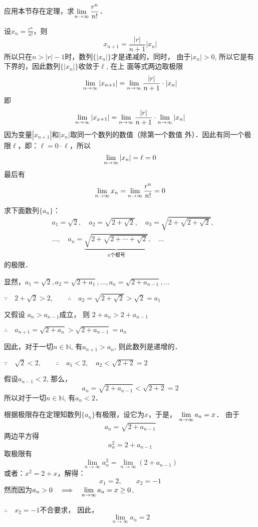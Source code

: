 \begin{example}
    应用本节存在定理，求$\displaystyle\lim_{n\to\infty}\dfrac{r^n}{n!}$．
\end{example}

\begin{solution}
    设$x_n=\frac{r^n}{n!}$，则
\[x_{n+1}=\frac{|r|}{n+1}|x_n|\]
所以只在$n>|r|-1$时，数列$\{|x_n|\}$才是递减的，同时，
由于$|x_n|>0$, 所以它是有下界的，因此数列$\{|x_n|\}$收敛于$\ell$, 在上
面等式两边取极限
\[\displaystyle\lim_{n\to\infty}|x_{n+1}|=\displaystyle\lim_{n\to\infty}\dfrac{|r|}{n+1}\cdot |x_n|\]
即
\[\displaystyle\lim_{n\to\infty}|x_{x+1}|=\displaystyle\lim_{n\to\infty}\dfrac{|r|}{n+1}\cdot \displaystyle\lim_{n\to\infty}|x_n|\]
因为变量$|x_{n+1}|$和$|x_n|$取同一个数列的数值（除第一个数值
外）．因此有同一个极限$\ell$，即：$\ell=0\cdot \ell$，所以
\[\displaystyle\lim_{n\to\infty}|x_n|=\ell=0\]
最后有
\[\displaystyle\lim_{n\to\infty} x_n=\displaystyle\lim_{n\to\infty} \dfrac{r^n}{n!} =0\]
\end{solution}

\begin{example}
    求下面数列$\{a_n\}$：
\[\begin{split}
   &  a_1=\sqrt{2},\quad a_2=\sqrt{2+\sqrt{2}},\quad a_3=\sqrt{2+\sqrt{2+\sqrt{2}}},\\
    & \ldots,\quad a_n=\underbrace{\sqrt{2+\sqrt{2+\cdots+\sqrt{2}}}}_{\text{$n$个根号}},\quad\ldots
\end{split} \]
的极限．
\end{example}
   
\begin{solution}
显然，$a_1=\sqrt{2}, a_2=\sqrt{2+a_1},\ldots,
a_n=\sqrt{2+a_{n-1}},\ldots$

$\because\quad 2+\sqrt{2}>2,\qquad \therefore\quad a_2=\sqrt{2+\sqrt{2}}>\sqrt{2}=a_1$

又假设
$a_n>a_{n-1}$成立，
则
$2+a_n>2+a_{n-1}$

$\therefore\quad a_{n+1}=\sqrt{2+a_n}>\sqrt{2+a_{n-1}}=a_n$

因此，对于一切$n\in\mathbb{N}$, 有$a_{n+1}>a_n$, 则此数列是递增的．

$\because\quad \sqrt{2}<2,\qquad \therefore\quad a_1<2,\quad a_2<\sqrt{2+2}=2$

假设$a_{n-1}<2$, 那么，
\[a_n=\sqrt{2+a_{n-1}}<\sqrt{2+2}=2\]
所以对于一切$n\in\mathbb{N}$, 有$a_n<2$．

根据极限存在定理知数列$\{a_n\}$有极限，设它为$x$，于是，
$\displaystyle\lim_{n\to\infty}a_n=x$．
由于
\[a_n=\sqrt{2+a_{n-1}}\]
两边平方得
\[a^2_n={2+a_{n-1}}\]
取极限有
\[\lim_{n\to\infty}a^2_n =\lim_{n\to\infty}(2+a_{n-1})\]
或者：$x^2=2+x$，解得：
\[x_1=2,\qquad x_2=-1\]
然而因为$a_n>0\quad \Longrightarrow\quad \displaystyle\lim_{n\to\infty}a_n=x\ge 0$,

$\therefore\quad x_2=-1$不合要求，
因此，
\[\lim_{n\to\infty}a_n=2\]
\end{solution}

